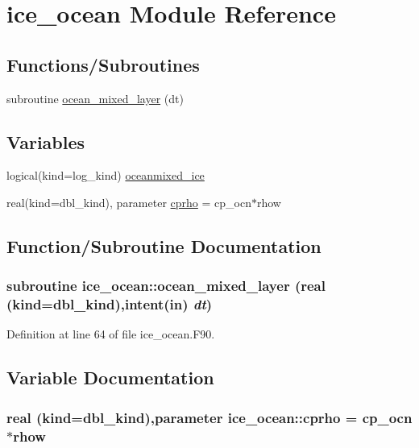 \hypertarget{namespaceice__ocean}{
\section{ice\_\-ocean Module Reference}
\label{namespaceice__ocean}
}
\subsection*{Functions/Subroutines}
\begin{DoxyCompactItemize}
\item 
subroutine \hyperlink{namespaceice__ocean_af0be25ef3889c1d787ab627860f0ce4c}{ocean\_\-mixed\_\-layer} (dt)
\end{DoxyCompactItemize}
\subsection*{Variables}
\begin{DoxyCompactItemize}
\item 
logical(kind=log\_\-kind) \hyperlink{namespaceice__ocean_ac7a4a91716b2a7a7aa7429576cb4375b}{oceanmixed\_\-ice}
\item 
real(kind=dbl\_\-kind), parameter \hyperlink{namespaceice__ocean_ae3c9a8abe47f32814e333bc76fca8735}{cprho} = cp\_\-ocn$\ast$rhow
\end{DoxyCompactItemize}


\subsection{Function/Subroutine Documentation}
\hypertarget{namespaceice__ocean_af0be25ef3889c1d787ab627860f0ce4c}{
\subsubsection[{ocean\_\-mixed\_\-layer}]{\setlength{\rightskip}{0pt plus 5cm}subroutine ice\_\-ocean::ocean\_\-mixed\_\-layer (real (kind=dbl\_\-kind),intent(in) {\em dt})}}
\label{namespaceice__ocean_af0be25ef3889c1d787ab627860f0ce4c}


Definition at line 64 of file ice\_\-ocean.F90.

\subsection{Variable Documentation}
\hypertarget{namespaceice__ocean_ae3c9a8abe47f32814e333bc76fca8735}{
\subsubsection[{cprho}]{\setlength{\rightskip}{0pt plus 5cm}real (kind=dbl\_\-kind),parameter {\bf ice\_\-ocean::cprho} = cp\_\-ocn$\ast$rhow}}
\label{namespaceice__ocean_ae3c9a8abe47f32814e333bc76fca8735}


